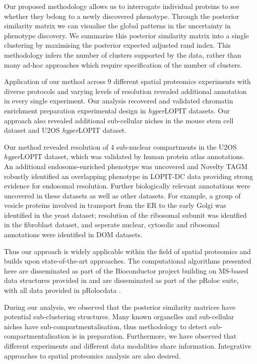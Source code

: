 \documentclass[12pt,english]{article}
\begin{document}
Our proposed methodology allows us to interrogate individual proteins to see whether they belong to a newly discovered phenotype. Through the posterior similarity matrix we can visualise the global patterns in the uncertainty in phenotype discovery. We summarise this posterior similarity matrix into a single clustering by maximising the posterior expected adjusted rand index. This methodology infers the number of clusters supported by the data, rather than many ad-hoc approaches which require specification of the number of clusters.

Application of our method across $9$ different spatial proteomics experiments with diverse protocols and varying levels of resolution revealed additional annotation in every single experiment. Our analysis recovered and validated chromatin enrichment preparation experimental design in \textit{hyper}LOPIT datasets. Our approach also revealed additional sub-cellular niches in the mouse stem cell dataset and U2OS \textit{hyper}LOPIT dataset.

Our method revealed resolution of $4$ sub-nuclear compartments in the U2OS \textit{hyper}LOPIT dataset, which was validated by human protein atlas annotations. An additional endosome-enriched phenotype was uncovered and Novelty TAGM robustly identified an overlapping phenotype in LOPIT-DC data providing strong evidence for endosomal resolution. Further biologically relevant annotations were uncovered in these datasets as well as other datasets. For example, a group of vesicle proteins involved in transport from the ER to the early Golgi was identified in the yeast dataset; resolution of the ribosomal subunit was identfied in the fibroblast dataset, and seperate nuclear, cytosolic and ribosomal annotations were identified in DOM datasets.

Thus our approach is widely applicable within the field of spatial proteomics and builds upon state-of-the-art approaches. The computational algorithms presented here are disseminated as part of the Bioconductor project \citep{Bioconductor::2004, Huber:2015} building on MS-based data structures provided in \cite{MSnbase:2012} and are disseminated as part of the pRoloc suite, with all data provided in pRolocdata \citep{pRoloc:2014}.

During our analysis, we observed that the posterior similarity matrices have potential sub-clustering structures. Many known organelles and sub-cellular niches have sub-compartmentalisation, thus methodology to detect sub-compartmentalisation is in preparation. Furthermore, we have observed that different experiments and different data modalities share information. Integrative approaches to spatial proteomics analysis are also desired. 
\end{document}
